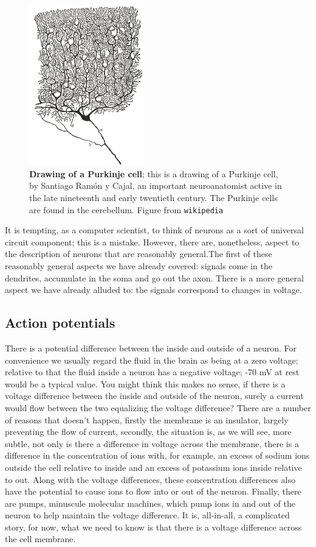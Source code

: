 \documentclass[12pt]{article}
\begin{document}
\begin{figure}[tbhp]
  \begin{center}
  \includegraphics[width=5cm]{PC.png}
\end{center}
  \caption{\textbf{Drawing of a Purkinje cell}; this is a drawing of a
    Purkinje cell, by Santiago Ram\'{o}n y Cajal, an important
    neuroanatomist active in the late nineteenth and early twentieth
    century. The Purkinje cells are found in the cerebellum. Figure from
    \texttt{wikipedia}\label{fig_PC}}
\end{figure}

It is tempting, as a computer scientist, to think of neurons as a sort
of universal circuit component; this is a mistake. However, there are,
nonetheless, aspect to the description of neurons that are reasonably
general.The first of these reasonably general aspects we have already
covered: signals come in the dendrites, accumulate in the soma and go
out the axon. There is a more general aspect we have already alluded
to: the signals correspond to changes in voltage.

\subsection{Action potentials}

There is a potential difference between the inside and outside of a
neuron. For convenience we usually regard the fluid in the brain as
being at a zero voltage; relative to that the fluid inside a neuron
has a negative voltage; -70 mV at rest would be a typical value. You
might think this makes no sense, if there is a voltage difference
between the inside and outside of the neuron, surely a current would
flow between the two equalizing the voltage difference? There are a
number of reasons that doesn't happen, firstly the membrane is an
insulator, largely preventing the flow of current, secondly, the
situation is, as we will see, more subtle, not only is there a
difference in voltage across the membrane, there is a difference in
the concentration of ions with, for example, an excess of sodium ions
outside the cell relative to inside and an excess of potassium ions
inside relative to out. Along with the voltage differences, these
concentration differences also have the potential to cause ions to
flow into or out of the neuron. Finally, there are pumps, minuscule
molecular machines, which pump ions in and out of the neuron to help
maintain the voltage difference. It is, all-in-all, a complicated
story, for now, what we need to know is that there is a voltage
difference across the cell membrane.
\end{document}
